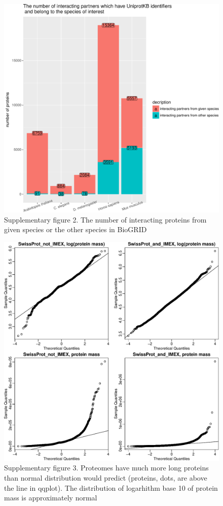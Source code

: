 \documentclass[]{article}
\begin{document}
\begin{figure}[htbp]
\centering
\includegraphics{final_report_files/figure-latex/Supplementary2_BioGRID_vs_IMEx_vs_Uniprot_N_Uniprot_Species-1.pdf}
\caption{Supplementary figure 2. The number of interacting proteins from
given species or the other species in BioGRID}
\end{figure}

\begin{figure}[htbp]
\centering
\includegraphics{final_report_files/figure-latex/Supplementary3_protein_mass_distribution_qqplot-1.pdf}
\caption{Supplementary figure 3. Proteomes have much more long proteins
than normal distribution would predict (proteins, dots, are above the
line in qqplot). The distribution of logarhithm base 10 of protein mass
is approximately normal}
\end{figure}
\end{document}
